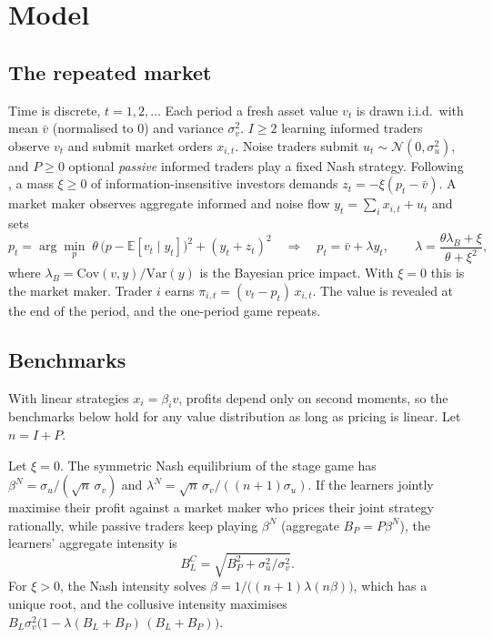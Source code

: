 \section{Model}
\label{sec:model}

\subsection{The repeated market}

Time is discrete, $t=1,2,\dots$ Each period a fresh asset value
$v_t$ is drawn i.i.d.\ with mean $\bar v$ (normalised to $0$) and variance
$\sigma_v^2$. $I\ge 2$ learning informed traders observe $v_t$ and submit
market orders $x_{i,t}$. Noise traders submit $u_t\sim\mathcal N(0,\sigma_u^2)$,
and $P\ge 0$ optional \emph{passive} informed traders play a fixed Nash
strategy. Following \citet{dou2025}, a mass $\xi\ge0$ of
information-insensitive investors demands $z_t=-\xi(p_t-\bar v)$. A market
maker observes aggregate informed and noise flow $y_t=\sum_i x_{i,t}+u_t$ and
sets
\begin{equation}
  p_t=\arg\min_p\; \theta\,\big(p-\mathbb E[v_t\mid y_t]\big)^2+(y_t+z_t)^2
  \quad\Longrightarrow\quad
  p_t=\bar v+\lambda y_t,\qquad
  \lambda=\frac{\theta\lambda_B+\xi}{\theta+\xi^2},
  \label{eq:lambda}
\end{equation}
where $\lambda_B=\mathrm{Cov}(v,y)/\mathrm{Var}(y)$ is the Bayesian price impact.
With $\xi=0$ this is the \citet{kyle1985} market maker. Trader $i$ earns
$\pi_{i,t}=(v_t-p_t)\,x_{i,t}$. The value is revealed at the end of the period,
and the one-period game repeats.

\subsection{Benchmarks}

With linear strategies $x_i=\beta_i v$, profits depend only on second moments,
so the benchmarks below hold for any value distribution as long as pricing is
linear. Let $n=I+P$.

\begin{proposition}\label{prop:bench}
Let $\xi=0$. The symmetric Nash equilibrium of the stage game has
$\beta^N=\sigma_u/(\sqrt n\,\sigma_v)$ and $\lambda^N=\sqrt n\,\sigma_v/((n+1)\sigma_u)$.
If the learners jointly maximise their profit against a market maker who prices
their joint strategy rationally, while passive traders keep playing
$\beta^N$ (aggregate $B_P=P\beta^N$), the learners' aggregate intensity is
\[
B_L^{C}=\sqrt{B_P^2+\sigma_u^2/\sigma_v^2}.
\]
For $\xi>0$, the Nash intensity solves $\beta=1/\big((n+1)\lambda(n\beta)\big)$,
which has a unique root, and the collusive intensity maximises
$B_L\sigma_v^2\big(1-\lambda(B_L+B_P)\,(B_L+B_P)\big)$.
\end{proposition}


